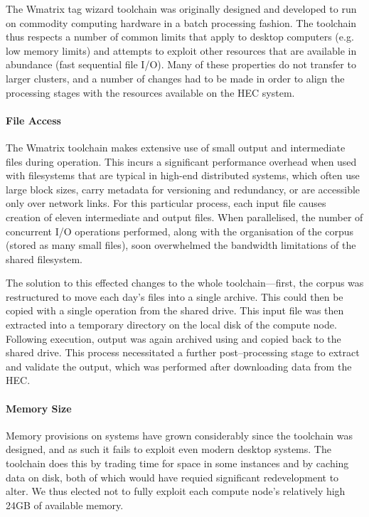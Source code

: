 
The Wmatrix tag wizard toolchain was originally designed and developed to run on commodity computing hardware in a batch processing fashion.  The toolchain thus respects a number of common limits that apply to desktop computers (e.g. low memory limits) and attempts to exploit other resources that are available in abundance (fast sequential file I/O).
Many of these properties do not transfer to larger clusters, and a number of changes had to be made in order to align the processing stages with the resources available on the HEC system.


\paragraph{File Access}
The Wmatrix toolchain makes extensive use of small output and intermediate files during operation.  This incurs a significant performance overhead when used with filesystems that are typical in high-end distributed systems, which often use large block sizes, carry metadata for versioning and redundancy, or are accessible only over network links.
For this particular process, each input file causes creation of eleven intermediate and output files.  When parallelised, the number of concurrent I/O operations performed, along with the organisation of the corpus (stored as many small files), soon overwhelmed the bandwidth limitations of the shared filesystem.

The solution to this effected changes to the whole toolchain---first, the corpus was restructured to move each day's files into a single  archive.  This could then be copied with a single operation from the shared drive.
This input file was then extracted into a temporary directory on the local disk of the compute node.
Following execution, output was again archived using  and copied back to the shared drive.  This process necessitated a further post--processing stage to extract and validate the output, which was performed after downloading data from the HEC.


\paragraph{Memory Size}
Memory provisions on systems have grown considerably since the toolchain was designed, and as such it fails to exploit even modern desktop systems. The toolchain does this by trading time for space in some instances and by caching data on disk, both of which would have requied significant redevelopment to alter.  We thus elected not to fully exploit each compute node's relatively high 24GB of available memory.




